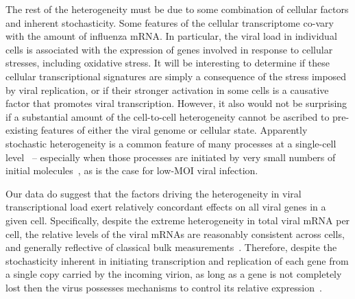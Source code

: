 \documentclass[9pt,lineno]{elife}
\begin{document}
The rest of the heterogeneity must be due to some combination of cellular factors and inherent stochasticity.
Some features of the cellular transcriptome co-vary with the amount of influenza mRNA. 
In particular, the viral load in individual cells is associated with the expression of genes involved in response to cellular stresses, including oxidative stress.
It will be interesting to determine if these cellular transcriptional signatures are simply a consequence of the stress imposed by viral replication, or if their stronger activation in some cells is a causative factor that promotes viral transcription.
However, it also would not be surprising if a substantial amount of the cell-to-cell heterogeneity cannot be ascribed to pre-existing features of either the viral genome or cellular state. 
Apparently stochastic heterogeneity is a common feature of many processes at a single-cell level~\citep{cai2006stochastic,raj2006stochastic,buganim2012single,shalek2013single,avraham2015pathogen} -- especially when those processes are initiated by very small numbers of initial molecules~\citep{elowitz2002stochastic}, as is the case for low-MOI viral infection.

Our data do suggest that the factors driving the heterogeneity in viral transcriptional load exert relatively concordant effects on all viral genes in a given cell.
Specifically, despite the extreme heterogeneity in total viral mRNA per cell, the relative levels of the viral mRNAs are reasonably consistent across cells, and generally reflective of classical bulk measurements~\citep{hatada1989control}.
Therefore, despite the stochasticity inherent in initiating transcription and replication of each gene from a single copy carried by the incoming virion, as long as a gene is not completely lost then the virus possesses mechanisms to control its relative expression~\citep{Shapiro:1987ur,hatada1989control,perez2010influenza,heldt2012modeling,chua2013influenza}.
\end{document}
